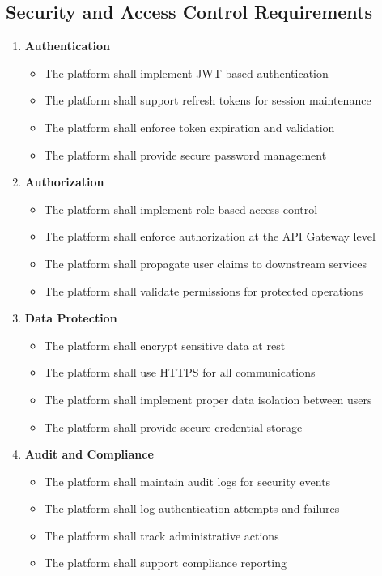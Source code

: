 \subsection{Security and Access Control Requirements}

\begin{enumerate}
   \item \textbf{Authentication}
   \begin{itemize}
      \item The platform shall implement JWT-based authentication
      \item The platform shall support refresh tokens for session maintenance
      \item The platform shall enforce token expiration and validation
      \item The platform shall provide secure password management
   \end{itemize}

   \item \textbf{Authorization}
   \begin{itemize}
      \item The platform shall implement role-based access control
      \item The platform shall enforce authorization at the API Gateway level
      \item The platform shall propagate user claims to downstream services
      \item The platform shall validate permissions for protected operations
   \end{itemize}

   \item \textbf{Data Protection}
   \begin{itemize}
      \item The platform shall encrypt sensitive data at rest
      \item The platform shall use HTTPS for all communications
      \item The platform shall implement proper data isolation between users
      \item The platform shall provide secure credential storage
   \end{itemize}

   \item \textbf{Audit and Compliance}
   \begin{itemize}
      \item The platform shall maintain audit logs for security events
      \item The platform shall log authentication attempts and failures
      \item The platform shall track administrative actions
      \item The platform shall support compliance reporting
   \end{itemize}
\end{enumerate}

